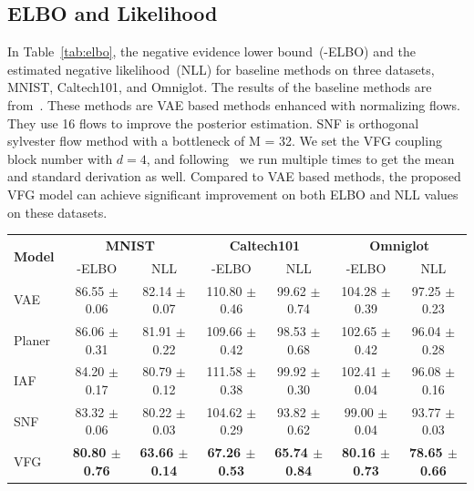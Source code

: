 \documentclass{article}
\begin{document}
\subsection{ELBO and Likelihood}\label{sec:exp:elbo}

In Table~\ref{tab:elbo}, the negative evidence lower bound~(-ELBO) and the estimated negative likelihood~(NLL) for baseline methods on three datasets, MNIST, Caltech101, and Omniglot. The results of the baseline methods are from~\cite{berg2018sylvester}. These methods are VAE based methods  enhanced with  normalizing flows.  They use 16 flows to improve the posterior estimation. SNF is orthogonal sylvester flow method with a bottleneck of M = 32. We set the VFG coupling block number with  $d=4$, and following~\cite{berg2018sylvester} we run multiple times to get the mean and standard derivation as well. Compared to VAE based methods, the proposed VFG model can achieve significant improvement on both ELBO and NLL values on these datasets.

\begin{center}
{\footnotesize
\begin{tabular}{l | c  c   c  c  c  c }
\hline
 \multirow{2}{0nc}{\textbf{Model}} & \multicolumn{2}{c}{\textbf{MNIST}} & \multicolumn{2}{c}{\textbf{Caltech101}} & \multicolumn{2}{c}{\textbf{Omniglot}} \\
 & -ELBO & NLL  &  -ELBO & NLL  & -ELBO & NLL  \\
\hline
 VAE~\cite{kingma2013auto} & 86.55 $\pm$ 0.06  & 82.14 $\pm$ 0.07& 110.80 $\pm$ 0.46 & 99.62 $\pm$ 0.74 & 104.28 $\pm$ 0.39 & 97.25 $\pm$ 0.23 \\
Planer~\cite{rezende2015variational} & 86.06 $\pm$ 0.31 & 81.91 $\pm$ 0.22 & 109.66 $\pm$ 0.42 & 98.53 $\pm$ 0.68 & 102.65 $\pm$ 0.42 & 96.04 $\pm$ 0.28 \\
IAF~\cite{kingma2016improving} & 84.20 $\pm$ 0.17& 80.79 $\pm$ 0.12 & 111.58 $\pm$ 0.38 & 99.92 $\pm$ 0.30 & 102.41 $\pm$ 0.04 & 96.08 $\pm$ 0.16 \\
SNF~\cite{berg2018sylvester} & 83.32 $\pm$ 0.06 & 80.22 $\pm$ 0.03 & 104.62 $\pm$ 0.29 & 93.82 $\pm$ 0.62 & 99.00 $\pm$ 0.04 & 93.77 $\pm$ 0.03 \\
\hline
VFG &\textbf{80.80 $\pm$ 0.76} & \textbf{63.66 $\pm$ 0.14} & \textbf{67.26 $\pm$ 0.53} & \textbf{65.74 $\pm$ 0.84}  &\textbf{80.16 $\pm$ 0.73 } & \textbf{78.65 $\pm$ 0.66}\\  
\hline
\end{tabular}
\label{tab:elbo}
}
\end{center}
\end{document}
